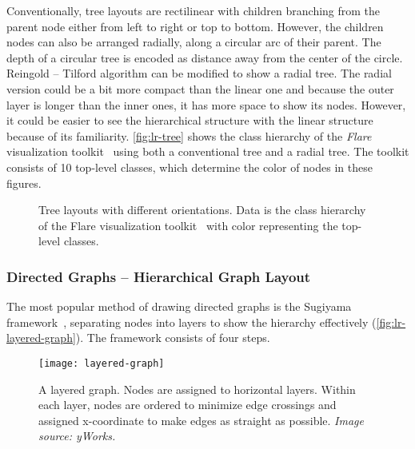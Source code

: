 Conventionally, tree layouts are rectilinear with children branching from the parent node either from left to right or top to bottom. However, the children nodes can also be arranged radially, along a circular arc of their parent. The depth of a circular tree is encoded as distance away from the center of the circle. Reingold -- Tilford algorithm can be modified to show a radial tree. The radial version could be a bit more compact than the linear one and because the outer layer is longer than the inner ones, it has more space to show its nodes. However, it could be easier to see the hierarchical structure with the linear structure because of its familiarity. \autoref{fig:lr-tree} shows the class hierarchy of the \emph{Flare} visualization toolkit~\cite{Heer2009b} using both a conventional tree and a radial tree. The toolkit consists of 10 top-level classes, which determine the color of nodes in these figures.

\begin{figure}[!htb]
\centering
{}
\hfill
{}
\caption{Tree layouts with different orientations. Data is the class hierarchy of the Flare visualization toolkit~\cite{Heer2009b} with color representing the top-level classes.}
\label{fig:lr-tree}
\end{figure}
  
\subsubsection{Directed Graphs -- Hierarchical Graph Layout}	
The most popular method of drawing directed graphs is the Sugiyama framework~\cite{Sugiyama1981}, separating nodes into layers to show the hierarchy effectively (\autoref{fig:lr-layered-graph}). The framework consists of four steps.

\begin{figure}[!htb]
	\centering
	\texttt{[image: layered-graph]}
	\caption{A layered graph. Nodes are assigned to horizontal layers. Within each layer, nodes are ordered to minimize edge crossings and assigned x-coordinate to make edges as straight as possible. \textrm{\emph{Image source: yWorks.}}}
	\label{fig:lr-layered-graph}
\end{figure}

